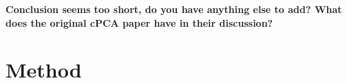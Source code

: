\documentclass[12pt]{article}
\begin{document}
\textbf{Conclusion seems too short, do you have anything else to add? What does the original cPCA paper have in their discussion?}
%
% 
% 



\section{Method}

\end{document}
